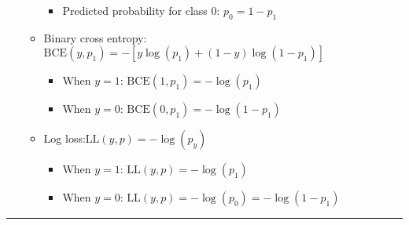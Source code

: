 \begin{itemize}
\begin{itemize}
\begin{itemize}
                \item Predicted probability for class 0: $p_0 = 1 - p_1$
            \end{itemize}
        \item Binary cross entropy: $\text{BCE}(y, p_1) = -[ y \log(p_1) + (1 - y) \log(1 - p_1) ]$
        \begin{itemize}
            \item When $y = 1$: $\text{BCE}(1, p_1) = -\log(p_1)$
            \item When $y = 0$: $\text{BCE}(0, p_1) = -\log(1 - p_1)$
        \end{itemize}
        \item Log loss:$\text{LL}(y, p) = - \log(p_y)$
        \begin{itemize}
            \item When $y = 1$: $\text{LL}(y, p) = -\log(p_1)$
            \item When $y = 0$: $\text{LL}(y, p) = -\log(p_0) = -\log(1 - p_1)$
        \end{itemize}
    \end{itemize}
\end{itemize}

{\color{lightgray}\hrule height 0.001mm}

